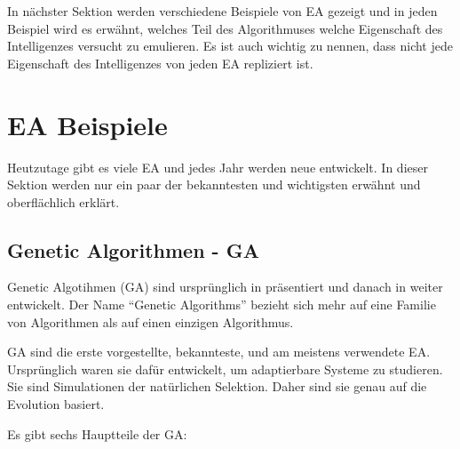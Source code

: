 \documentclass[twoside,twocolumn]{article}
\begin{document}
In nächster Sektion werden verschiedene Beispiele von EA gezeigt und in jeden Beispiel wird es erwähnt, welches Teil des Algorithmuses welche Eigenschaft des Intelligenzes versucht zu emulieren. Es ist auch wichtig zu nennen, dass nicht jede Eigenschaft des Intelligenzes von jeden EA repliziert ist.


\section{EA Beispiele}

Heutzutage gibt es viele EA und jedes Jahr werden neue entwickelt. In dieser Sektion werden nur ein paar der bekanntesten und wichtigsten erwähnt und oberflächlich erklärt.

\subsection{Genetic Algorithmen - GA}
Genetic Algotihmen (GA) sind ursprünglich in \cite{holland_ga} präsentiert und danach in \cite{goldberg_ga} weiter entwickelt. Der Name \enquote{Genetic Algorithms} bezieht sich mehr auf eine Familie von Algorithmen als auf einen einzigen Algorithmus.\par
GA sind die erste vorgestellte, bekannteste, und am meistens verwendete EA. Ursprünglich waren sie dafür entwickelt, um adaptierbare Systeme zu studieren. Sie sind Simulationen der natürlichen Selektion. Daher sind sie genau auf die Evolution basiert.\par
Es gibt sechs Hauptteile der GA:
\end{document}
